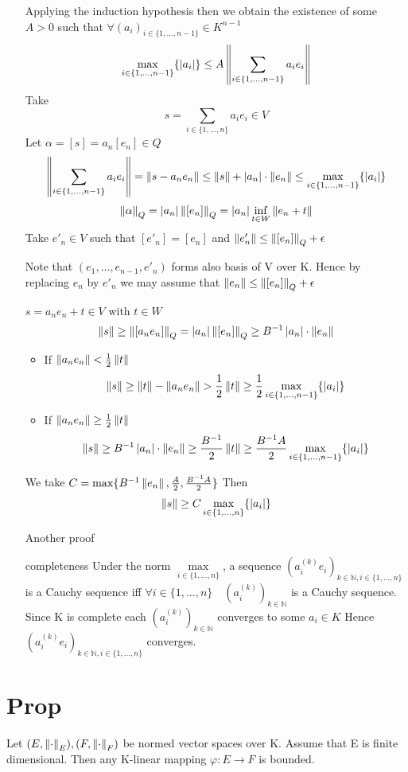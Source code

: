 \documentclass{book}
\newcommand{\abs}[1]{\left\lvert #1 \right\rvert}
\begin{document}
\begin{itemize}
    Applying the induction hypothesis then we obtain the existence of some $A>0$ such that $\forall(a_i)_{i\in \{1,...,n-1\}}\in K^{n-1}$$$\max\limits_{i\in \{1,...,n-1\}}\{\abs{a_i}\}\leq A\norm{\sum\limits_{i\in \{1,...,n-1\}}a_ie_i}$$ 
    Take $$s=\sum\limits_{i\in \{1,...,n\}}a_ie_i\in V$$
    Let $\alpha=[s]=a_n[e_n]\in Q$$$\norm{\sum\limits_{i\in \{1,...,n-1\}}a_ie_i}=\norm{s-a_ne_n}\leq\norm{s}+\abs{a_n}\cdot\norm{e_n}\leq \max\limits_{i\in \{1,...,n-1\}}\{\abs{a_i}\}$$
    $$\norm{\alpha}_Q=\abs{a_n}\norm{[e_n]}_Q=\abs{a_n}\inf\limits_{t\in W}\norm{e_n+t}$$
    Take $e'_n\in V$ such that $[e'_n]=[e_n]$ and $\left\lVert e'_n \right\rVert\leq\left\lVert [e_n] \right\rVert_Q+\epsilon$

    Note that $(e_1,...,e_{n-1},e'_n)$ forms also basis of V over K. Hence by replacing $e_n$ by $e'_n$ we may assume that $\left\lVert e_n \right\rVert\leq\left\lVert [e_n] \right\rVert_Q+\epsilon$

    $s=a_ne_n+t\in V$ with $t\in W$$$\norm{s}\geq\norm{[a_ne_n]}_Q=\abs{a_n}\norm{[e_n]}_Q\geq B^{-1}\abs{a_n}\cdot\norm{e_n}$$
    \begin{itemize}
        \item If $\left\lVert a_ne_n \right\rVert<\frac{1}{2}\left\lVert t \right\rVert$ $$\norm{s}\geq \norm{t}-\norm{a_ne_n}>\frac{1}{2}\norm{t}\geq \frac{1}{2}\max\limits_{i\in \{1,...,n-1\}}\{\abs{a_i}\}$$
        \item If $\left\lVert a_ne_n \right\rVert\geq\frac{1}{2}\left\lVert t \right\rVert$$$\norm{s}\geq B^{-1}\abs{a_n}\cdot\norm{e_n}\geq \frac{B^{-1}}{2}\norm{t}\geq\frac{B^{-1}A}{2}\max\limits_{i\in \{1,...,n-1\}}\{\abs{a_i}\}$$
    \end{itemize}
    We take $C=\max\{B^{-1}\left\lVert e_n \right\rVert,\frac{A}{2},\frac{B^{-1}A}{2}\}$
    Then $$\norm{s}\geq C\max\limits_{i\in \{1,...,n\}}\{\abs{a_i}\}$$
    \item[Another proof]
    \item[completeness]
    Under the norm $\max\limits_{i\in \{1,...,n\}}$, a sequence $(a^{(k)}_ie_i)_{k\in \mathbb{N},i\in \{1,...,n\}}$ is a Cauchy sequence iff $\forall i\in \{1,...,n\}\quad (a_i^{(k)})_{k\in \mathbb{N}}$ is a Cauchy sequence. Since K is complete each $(a_i^{(k)})_{k\in \mathbb{N}}$ converges to some $a_i\in K$ Hence $(a^{(k)}_ie_i)_{k\in \mathbb{N},i\in \{1,...,n\}}$ converges.
\end{itemize}
\section{Prop}
Let $(E,\left\lVert \cdot \right\rVert_E),(F,\left\lVert \cdot \right\rVert_F)$ be normed vector spaces over K. Assume that E is finite dimensional. Then any K-linear mapping $\varphi:E\rightarrow F$ is bounded.
\end{document}
